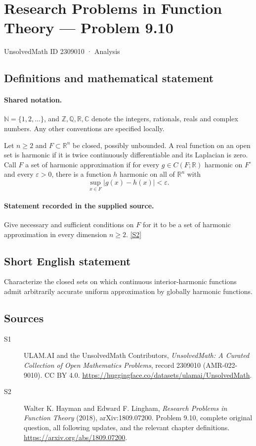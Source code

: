 \documentclass[11pt]{book}
\newcommand{\sref}[2]{\hyperlink{source:#1:#2}{[S#2]}}
\begin{document}
\setcounter{section}{2309009}
\section{Research Problems in Function Theory — Problem 9.10}\label{2309010}
{\small\sffamily UnsolvedMath ID 2309010 · Analysis}
\subsection{Definitions and mathematical statement}

\paragraph{Shared notation.}$\mathbb N=\{1,2,\ldots\}$, and $\mathbb Z,\mathbb Q,\mathbb R,\mathbb C$ denote the integers, rationals, reals and complex numbers. Any other conventions are specified locally.


Let $n\ge2$ and $F\subset\mathbb R^n$ be closed, possibly unbounded. A real function on an open set is harmonic if it is twice continuously differentiable and its Laplacian is zero. Call $F$ a set of harmonic approximation if for every $g\in C(F;\mathbb R)$ harmonic on $F^{\circ}$ and every $\varepsilon>0$, there is a function $h$ harmonic on all of $\mathbb R^n$ with \[\sup_{x\in F}|g(x)-h(x)|<\varepsilon.\]
\paragraph{Statement recorded in the supplied source.}
Give necessary and sufficient conditions on $F$ for it to be a set of harmonic approximation in every dimension $n\ge2$. \sref{2309010}{2}
\subsection{Short English statement}
Characterize the closed sets on which continuous interior-harmonic functions admit arbitrarily accurate uniform approximation by globally harmonic functions.
\subsection{Sources}
\begin{description}
\item[\hypertarget{source:2309010:1}{S1}] ULAM.AI and the UnsolvedMath Contributors, \emph{UnsolvedMath: A Curated Collection of Open Mathematics Problems}, record 2309010 (AMR-022-9010). CC BY 4.0. \url{https://huggingface.co/datasets/ulamai/UnsolvedMath}.
\item[\hypertarget{source:2309010:2}{S2}] Walter K. Hayman and Edward F. Lingham, \emph{Research Problems in Function Theory} (2018), arXiv:1809.07200. Problem 9.10, complete original question, all following updates, and the relevant chapter definitions. \url{https://arxiv.org/abs/1809.07200}.
\end{description}
\label{end:2309010}
\end{document}
